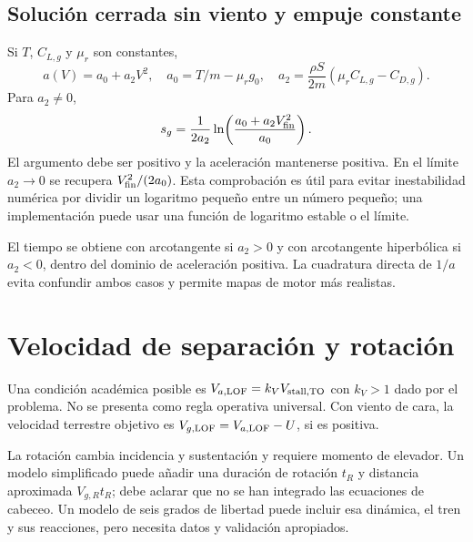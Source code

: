 \subsection{Solución cerrada sin viento y empuje constante}
Si $T$, $C_{L,g}$ y $\mu_r$ son constantes,
\begin{equation}
a(V)=a_0+a_2V^2,
\quad a_0=T/m-\mu_rg_0,
\quad a_2=\frac{\rho S}{2m}(\mu_rC_{L,g}-C_{D,g}).
\end{equation}
Para $a_2\neq0$,
\begin{equation}
s_g=\frac{1}{2a_2}\ln\!\left(\frac{a_0+a_2V_{\rm fin}^2}{a_0}\right).
\label{eq:rolllog}
\end{equation}
El argumento debe ser positivo y la aceleración mantenerse positiva. En el límite $a_2\to0$ se recupera $V_{\rm fin}^2/(2a_0)$. Esta comprobación es útil para evitar inestabilidad numérica por dividir un logaritmo pequeño entre un número pequeño; una implementación puede usar una función de logaritmo estable o el límite.

El tiempo se obtiene con arcotangente si $a_2>0$ y con arcotangente hiperbólica si $a_2<0$, dentro del dominio de aceleración positiva. La cuadratura directa de $1/a$ evita confundir ambos casos y permite mapas de motor más realistas.

\section{Velocidad de separación y rotación}
Una condición académica posible es $V_{a,\rm LOF}=k_VV_{\rm stall,TO}$ con $k_V>1$ dado por el problema. No se presenta como regla operativa universal. Con viento de cara, la velocidad terrestre objetivo es $V_{g,\rm LOF}=V_{a,\rm LOF}-U$, si es positiva.

La rotación cambia incidencia y sustentación y requiere momento de elevador. Un modelo simplificado puede añadir una duración de rotación $t_R$ y distancia aproximada $V_{g,R}t_R$; debe aclarar que no se han integrado las ecuaciones de cabeceo. Un modelo de seis grados de libertad puede incluir esa dinámica, el tren y sus reacciones, pero necesita datos y validación apropiados.


